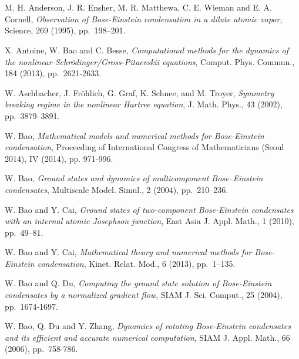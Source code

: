 \documentclass{elsarticle}
\begin{document}


\section*{\refname}
\begin{thebibliography}{}
{\sc M. H. Anderson, J. R. Ensher, M. R. Matthewa, C. E.
Wieman and E. A. Cornell},
\textit{Observation of Bose-Einstein
condensation in a dilute atomic vapor}, Science, 269 (1995),
pp.~198--201.

{\sc X. Antoine, W. Bao and C. Besse},
\textit{Computational methods for the dynamics of the nonlinear Schr\"odinger/Gross-Pitaevskii equations},
Comput. Phys. Commun.,  184 (2013), pp.~2621-2633.

{\sc W. Aschbacher, J. Fr\"{o}hlich, G. Graf, K. Schnee, and M. Troyer},
 \textit{Symmetry breaking regime in the nonlinear Hartree equation},
 J. Math. Phys., 43 (2002), pp.~3879--3891.

{\sc W. Bao},
\textit{Mathematical models and numerical methods for Bose-Einstein condensation},
Proceeding of International Congress of Mathematicians (Seoul 2014), IV (2014), pp. 971-996.


{\sc W. Bao}, \textit{Ground states and dynamics of multicomponent
Bose--Einstein condensates}, Multiscale Model. Simul., 2 (2004),
pp.~210--236.

{\sc W. Bao and Y. Cai},
\textit{Ground states of two-component Bose-Einstein condensates with an internal atomic Josephson junction},
East Asia J. Appl. Math., 1 (2010), pp.~49--81.

{\sc W. Bao and Y. Cai},
\textit{Mathematical theory and numerical methods for Bose-Einstein condensation},
Kinet. Relat. Mod.,  6 (2013), pp.~1--135.

{\sc W. Bao and Q. Du}, \textit{Computing the ground state solution
of Bose-Einstein condensates by a normalized gradient flow}, SIAM J.
Sci. Comput., 25 (2004), pp.~1674-1697.

{\sc W. Bao, Q. Du and Y. Zhang}, \textit{Dynamics of rotating Bose-Einstein condensates and its efficient and accurate numerical computation}, SIAM J. Appl. Math., 66 (2006), pp.~758-786.




\end{thebibliography}
\end{document}
